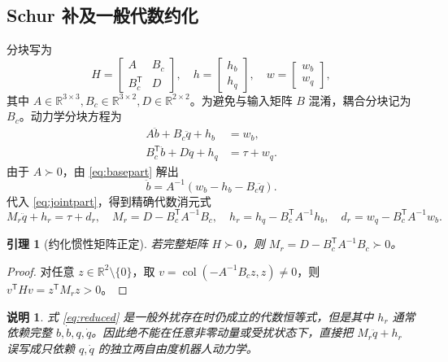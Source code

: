 \documentclass[journal,onecolumn]{IEEEtran}
\newtheorem{lemma}{引理}[section]
\newtheorem{remark}{说明}[section]
\newcommand{\R}{\mathbb R}
\newcommand{\tr}{\mathsf T}
\newcommand{\col}{\operatorname{col}}
\begin{document}
\subsection{Schur 补及一般代数约化}
分块写为
\begin{equation}
 H=\begin{bmatrix}A&B_c\\B_c^\tr&D\end{bmatrix},\quad
 h=\begin{bmatrix}h_b\\h_q\end{bmatrix},\quad
 w=\begin{bmatrix}w_b\\w_q\end{bmatrix},
\end{equation}
其中 $A\in\R^{3\times3},B_c\in\R^{3\times2},D\in\R^{2\times2}$。为避免与输入矩阵 $B$ 混淆，耦合分块记为 $B_c$。动力学分块方程为
\begin{align}
 A\ddot b+B_c\ddot q+h_b&=w_b,\label{eq:basepart}\\
 B_c^\tr\ddot b+D\ddot q+h_q&=\tau+w_q.\label{eq:jointpart}
\end{align}
由于 $A\succ0$，由 \eqref{eq:basepart} 解出
\begin{equation}
 \ddot b=A^{-1}(w_b-h_b-B_c\ddot q).
\end{equation}
代入 \eqref{eq:jointpart}，得到精确代数消元式
\begin{equation}
 \boxed{M_r\ddot q+h_r=\tau+d_r,\quad
 M_r=D-B_c^\tr A^{-1}B_c,\quad
 h_r=h_q-B_c^\tr A^{-1}h_b,\quad
 d_r=w_q-B_c^\tr A^{-1}w_b.}
 \label{eq:reduced}
\end{equation}
\begin{lemma}[约化惯性矩阵正定]
若完整矩阵 $H\succ0$，则 $M_r=D-B_c^\tr A^{-1}B_c\succ0$。
\end{lemma}
\begin{proof}
对任意 $z\in\R^2\setminus\{0\}$，取 $v=\col(-A^{-1}B_cz,z)\neq0$，则 $v^\tr Hv=z^\tr M_rz>0$。
\end{proof}
\begin{remark}
式 \eqref{eq:reduced} 是\emph{一般外扰存在时仍成立}的代数恒等式，但是其中 $h_r$ 通常依赖完整 $b,\dot b,q,\dot q$。因此绝不能在任意非零动量或受扰状态下，直接把 $M_r\ddot q+h_r$ 误写成只依赖 $q,\dot q$ 的独立两自由度机器人动力学。
\end{remark}
\end{document}
